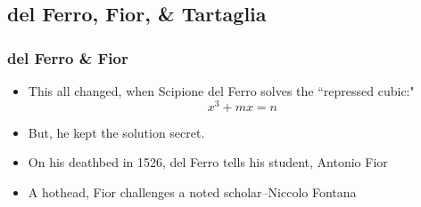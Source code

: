 \documentclass{beamer}
\begin{document}
\subsection{del Ferro, Fior, \& Tartaglia}
\begin{frame}
\frametitle{del Ferro \& Fior}

\begin{itemize}
    \item
    This all changed, when Scipione del Ferro solves the ``repressed cubic:"
    \begin{equation*}
        x^3 + mx = n
    \end{equation*}
    \item
    But, he kept the solution secret.
    \item On his deathbed in 1526, del Ferro tells his student, Antonio
    Fior
    \item A hothead, Fior challenges a noted scholar--Niccolo Fontana
\end{itemize}
\end{frame}

\end{document}
